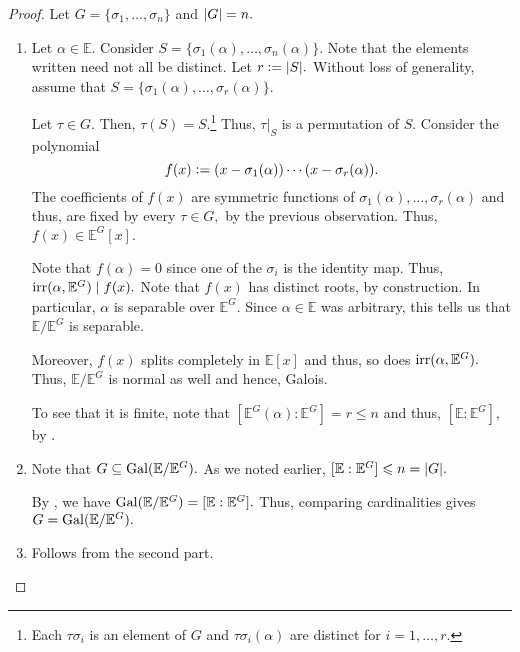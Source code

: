 \artin*\label{thm:artin2}
\begin{flushright}\hyperref[thm:artin]{\upsym}\end{flushright}
\begin{proof}
    Let $G = \{\sigma_1, \ldots, \sigma_n\}$ and ${\left\lvert G \right\lvert} = n.$
    \begin{enumerate}[leftmargin=*]
        \item Let $\alpha \in \mathbb{E}.$ Consider $S = \{\sigma_1(\alpha), \ldots, \sigma_n(\alpha)\}.$ Note that the elements written need not all be distinct. Let $r \vcentcolon= {\left\lvert S \right\lvert}.$ Without loss of generality, assume that $S = \{\sigma_1(\alpha), \ldots, \sigma_r(\alpha)\}.$

        Let $\tau \in G.$ Then, $\tau(S) = S.$\footnote{Each $\tau\sigma_i$ is an element of $G$ and $\tau\sigma_i(\alpha)$ are distinct for $i = 1, \ldots, r.$} Thus, $\tau|_{S}$ is a permutation of $S.$ Consider the polynomial
        \begin{equation*} 
            f(x) \vcentcolon= (x - \sigma_1(\alpha)) \cdots (x - \sigma_r(\alpha)).
        \end{equation*}
        The coefficients of $f(x)$ are symmetric functions of $\sigma_1(\alpha), \ldots, \sigma_r(\alpha)$ and thus, are fixed by every $\tau \in G,$ by the previous observation. Thus, $f(x) \in \mathbb{E}^G[x].$

        Note that $f(\alpha) = 0$ since one of the $\sigma_i$ is the identity map. Thus, $\operatorname{irr}(\alpha, \mathbb{E}^G) \mid f(x).$ Note that $f(x)$ has distinct roots, by construction. In particular, $\alpha$ is separable over $\mathbb{E}^G.$ Since $\alpha \in \mathbb{E}$ was arbitrary, this tells us that $\mathbb{E}/\mathbb{E}^G$ is separable.

        Moreover, $f(x)$ splits completely in $\mathbb{E}[x]$ and thus, so does $\operatorname{irr}(\alpha, \mathbb{E}^G).$ Thus, $\mathbb{E}/\mathbb{E}^G$ is normal as well and hence, Galois.

        To see that it is finite, note that $[\mathbb{E}^G(\alpha) : \mathbb{E}^G] = r \le n$ and thus, $[\mathbb{E} : \mathbb{E}^G],$ by .
        \item Note that $G \subseteq \operatorname{Gal}(\mathbb{E}/\mathbb{E}^G).$ As we noted earlier, $[\mathbb{E} : \mathbb{E}^G] \leqslant n = {\left\lvert G \right\lvert}.$ 

        By , we have $\operatorname{Gal}(\mathbb{E}/\mathbb{E}^G) = [\mathbb{E} : \mathbb{E}^G].$ Thus, comparing cardinalities gives $G = \operatorname{Gal}(\mathbb{E}/\mathbb{E}^G).$
        \item Follows from the second part. \qedhere
    \end{enumerate}
\end{proof}

